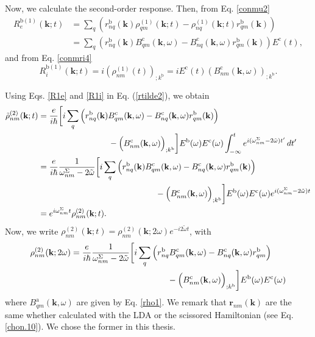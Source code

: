Now, we calculate the second-order response. Then, from Eq. \eqref{conmu2}
\begin{align}\label{R1e}
R_e^{\mathrm{b}(1)}(\mathbf{k};t)
&=
\sum_{q}
\left(
r^{\mathrm{b}}_{nq}(\mathbf{k})
\rho^{(1)}_{q m}(\mathbf{k};t)
-
\rho^{(1)}_{nq}(\mathbf{k};t)
r^{\mathrm{b}}_{q m}(\mathbf{k})
\right)
\nonumber \\
&=
\sum_{q}
\left(
r^{\mathrm{b}}_{nq}(\mathbf{k})
B^{\mathrm{c}}_{q m}(\mathbf{k},\omega)
-
B^{\mathrm{c}}_{nq}(\mathbf{k},\omega)
r^{\mathrm{b}}_{q m}(\mathbf{k})
\right)E^{\mathrm{c}}(t)
,
\end{align}
and from Eq. \eqref{conmri4}
\begin{equation}\label{R1i}
R_{i}^{\mathrm{b}(1)}(\mathbf{k};t)=
i(\rho^{(1)}_{nm}(t))_{;k^{\mathrm{b}}}=
iE^{\mathrm{c}}(t)(B^{\mathrm{c}}_{nm}(\mathbf{k},\omega))_{;k^{\mathrm{b}}}.
\end{equation}

Using Eqs. \eqref{R1e} and  \eqref{R1i} in Eq. (\ref{rtilde2}), we obtain
\begin{align}\label{rtilde33}
\tilde{\rho}^{(2)}_{nm}(\mathbf{k};t)
&=
\frac{e}{i\hbar}
\bigg[
i\sum_{q}
\Big(
  r^{\mathrm{b}}_{nq}(\mathbf{k})B^{\mathrm{c}}_{q m}(\mathbf{k},\omega)
- B^{\mathrm{c}}_{nq}(\mathbf{k},\omega)r^{\mathrm{b}}_{q m}(\mathbf{k})
\Big)\nonumber\\
&\hspace*{3cm}- \Big(B^{\mathrm{c}}_{nm}(\mathbf{k},\omega)\Big)_{;k^{\mathrm{b}}}
\bigg]
E^{\mathrm{b}}(\omega)E^{\mathrm{c}}(\omega)
\int_{-\infty}^{t} e^{i(\omega^\Sigma_{nm}-2\tilde{\omega})t'}\,dt'\nonumber \\
&= \frac{e}{i\hbar}
\frac{1}{\omega^\Sigma_{nm}-2\tilde{\omega}}
\bigg[
i\sum_{q}
\Big(
  r^{\mathrm{b}}_{nq}(\mathbf{k})B^{\mathrm{c}}_{q m}(\mathbf{k},\omega)
- B^{\mathrm{c}}_{nq}(\mathbf{k},\omega)r^{\mathrm{b}}_{q m}(\mathbf{k})
\Big)\nonumber\\
&\hspace*{5cm}- \Big(B^{\mathrm{c}}_{nm}(\mathbf{k},\omega)\Big)_{;k^{\mathrm{b}}}
\bigg]
E^{\mathrm{b}}(\omega)E^{\mathrm{c}}(\omega)
e^{i(\omega^\Sigma_{nm}-2\tilde{\omega})t}
\nonumber \\
&= e^{i\omega^\Sigma_{nm}t}\rho_{nm}^{(2)}(\mathbf{k};t).
\end{align}
Now, we write
$\rho_{nm}^{(2)}(\mathbf{k};t)
=\rho_{nm}^{(2)}(\mathbf{k};2\omega)e^{-i2\tilde{\omega}t}$,
with
\begin{align}\label{rho2}
\rho_{nm}^{(2)}(\mathbf{k};2\omega)
&=\frac{e}{i\hbar}\frac{1}{\omega^\Sigma_{nm}-2\tilde{\omega}}
\bigg[
i\sum_q
\Big(
  r_{nq}^{\mathrm{b}}B_{q m}^{\mathrm{c}}(\mathbf{k},\omega)
- B_{nq}^{\mathrm{c}}(\mathbf{k},\omega)r_{q m}^{\mathrm{b}}
  \Big)\nonumber\\
&\hspace*{4cm}- \Big(B_{nm}^{\mathrm{c}}(\mathbf{k},\omega)\Big)_{;k^{\mathrm{b}}}
\bigg] 
E^{\mathrm{b}}(\omega)E^{\mathrm{c}}(\omega)
\end{align} 
where $B_{q m}^{\mathrm{a}}(\mathbf{k},\omega)$ are given by Eq.
\eqref{rho1}. We remark that $\mathbf{r}_{nm}(\mathbf{k})$  are the same whether
calculated with the LDA or the scissored Hamiltonian (see Eq. \eqref{chon.10}).
We chose the former in this thesis.

